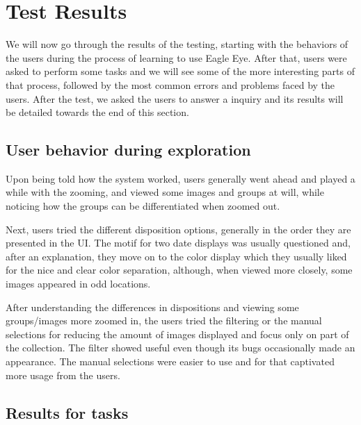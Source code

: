 \section{Test Results}

We will now go through the results of the testing, starting with the behaviors of the users during the process of learning to use Eagle Eye. After that, users were asked to perform some tasks and we will see some of the more interesting parts of that process, followed by the most common errors and problems faced by the users. After the test, we asked the users to answer a inquiry and its results will be detailed towards the end of this section.






\subsection{User behavior during exploration}

Upon being told how the system worked, users generally went ahead and played a while with the zooming, and viewed some images and groups at will, while noticing how the groups can be differentiated when zoomed out.

Next, users tried the different disposition options, generally in the order they are presented in the \ac{UI}. The motif for two date displays was usually questioned and, after an explanation, they move on to the color display which they usually liked for the nice and clear color separation, although, when viewed more closely, some images appeared in odd locations.

After understanding the differences in dispositions and viewing some groups/images more zoomed in, the users tried the filtering or the manual selections for reducing the amount of images displayed and focus only on part of the collection. The filter showed useful even though its bugs occasionally made an appearance. The manual selections were easier to use and for that captivated more usage from the users.





\subsection{Results for tasks}

